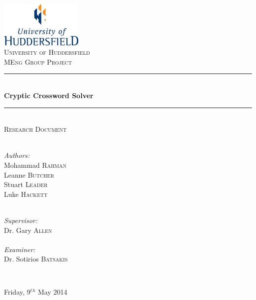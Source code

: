 \newcommand{\HRule}{\rule{\linewidth}{0.5mm}}

\begin{titlepage}
  \begin{center}

  \includegraphics[width=0.3\textwidth]{../UoHLogo.jpg} \\[2.5cm]

  \textsc{\LARGE University of Huddersfield} \\[1.5cm]

  \textsc{\Large MEng Group Project} \\[0.75cm]

  \HRule \\[0.4cm]
    { \huge \bfseries Cryptic Crossword Solver }
  \\[0.1cm]

  \HRule \\[0.75cm]

  \textsc{\Large Research Document} \\[2cm]

  \begin{minipage}{0.4\textwidth}
    \begin{flushleft} \large ~\\
      \emph{Authors:}\\
      Mohammad \textsc{Rahman} \\
      Leanne \textsc{Butcher} \\
      Stuart \textsc{Leader} \\
      Luke \textsc{Hackett} 
    \end{flushleft}
  \end{minipage}
  \begin{minipage}{0.4\textwidth}
    \begin{flushright} \large ~\\
      \emph{Supervisor:} \\ 
      Dr. Gary \textsc{Allen}
      ~\\ ~\\
      \emph{Examiner:} \\
      Dr. Sotirios \textsc{Batsakis} 
    \end{flushright}
  \end{minipage}

  ~\\[0.01cm]


  \vfill

  {\large Friday, 9$^t$$^h$ May 2014}

  \end{center}
\end{titlepage}
